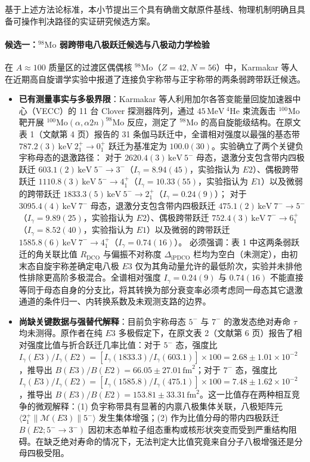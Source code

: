 基于上述方法论标准，本小节提出三个具有确凿文献原件基线、物理机制明确且具备可操作判决路径的实证研究候选方案。

\paragraph{候选一：$^{98}\mathrm{Mo}$ 弱跨带电八极跃迁候选与八极动力学检验}
在 $A \approx 100$ 质量区的过渡区偶偶核 $^{98}\mathrm{Mo}$（$Z=42, N=56$）中，Karmakar 等人在近期高自旋谱学实验中报道了连接负宇称带与正宇称带的两条弱跨带跃迁候选。\cite{karmakar-2026-98mo-octupole}
\begin{itemize}
\item \textbf{已有测量事实与多极界限}：Karmakar 等人利用加尔各答变能量回旋加速器中心（VECC）的 11 台 Clover 探测器阵列，通过 $45\,\mathrm{MeV}\ ^4\mathrm{He}$ 束流轰击 $^{100}\mathrm{Mo}$ 靶开展 $^{100}\mathrm{Mo}(\alpha, \alpha 2n)^{98}\mathrm{Mo}$ 反应，测定了 $^{98}\mathrm{Mo}$ 的高自旋能级结构。在原文表 1（文献第 4 页）报告的 31 条伽马跃迁中，全谱相对强度以最强的基态带 $787.2(3)\,\mathrm{keV}\ 2_1^+ \to 0_1^+$ 跃迁为基准定为 $100.0(30)$。实验确立了两个关键负宇称母态的退激路径：
对于 $2620.4(3)\,\mathrm{keV}\ 5^-$ 母态，退激分支包含带内四极跃迁 $603.1(2)\,\mathrm{keV}\ 5^- \to 3^-$（$I_\gamma = 8.94(45)$，实验指认为 $E2$）、偶极跨带跃迁 $1110.8(3)\,\mathrm{keV}\ 5^- \to 4_1^+$（$I_\gamma = 10.33(55)$，实验指认为 $E1$）以及微弱的跨带跃迁 $1833.3(5)\,\mathrm{keV}\ 5^- \to 2_1^+$（$I_\gamma = 0.24(9)$）；
对于 $3095.4(4)\,\mathrm{keV}\ 7^-$ 母态，退激分支包含带内四极跃迁 $475.1(2)\,\mathrm{keV}\ 7^- \to 5^-$（$I_\gamma = 9.89(25)$，实验指认为 $E2$）、偶极跨带跃迁 $752.4(3)\,\mathrm{keV}\ 7^- \to 6_1^+$（$I_\gamma = 8.52(40)$，实验指认为 $E1$）以及微弱的跨带跃迁 $1585.8(6)\,\mathrm{keV}\ 7^- \to 4_1^+$（$I_\gamma = 0.74(16)$）。
必须强调：表 1 中这两条弱跃迁的角关联比值 $R_{\mathrm{DCO}}$ 与偏振不对称度 $\Delta_{\mathrm{iPDCO}}$ 栏均为空白（未测定），由初末态自旋宇称差确定电八极 $E3$ 仅为其角动量允许的最低阶次，实验并未排他性排除更高阶多极混合。全谱相对强度 $I_\gamma = 0.24(9)$ 与 $0.74(16)$ 不能直接等同于母态自身的分支比，将其转换为部分衰变率必须考虑同一母态其它退激通道的条件归一、内转换系数及未观测支路的边界。
\item \textbf{尚缺关键数据与强替代解释}：目前负宇称母态 $5^-$ 与 $7^-$ 的激发态绝对寿命 $\tau$ 均未测得。原作者在纯 $E3$ 多极假定下，在原文表 2（文献第 6 页）报告了相对强度比值与折合跃迁几率比值：对于 $5^-$ 态，强度比 $I_\gamma(E3)/I_\gamma(E2) = [I_\gamma(1833.3)/I_\gamma(603.1)] \times 100 = 2.68 \pm 1.01 \times 10^{-2}$，推导出 $B(E3)/B(E2) = 66.05 \pm 27.01\,\mathrm{fm}^2$；对于 $7^-$ 态，强度比 $I_\gamma(E3)/I_\gamma(E2) = [I_\gamma(1585.8)/I_\gamma(475.1)] \times 100 = 7.48 \pm 1.62 \times 10^{-2}$，推导出 $B(E3)/B(E2) = 153.81 \pm 33.31\,\mathrm{fm}^2$。这一比值存在两种相互竞争的微观解释：(1) 负宇称带具有显著的内禀八极集体关联，八极矩阵元 $\langle 2_1^+ \| \mathcal{M}(E3) \| 5^- \rangle$ 发生集体增强；(2) 作为比值分母的带内四极跃迁 $B(E2; 5^- \to 3^-)$ 因初末态单粒子组态重构或核形状突变而受到严重结构阻碍。在缺乏绝对寿命的情况下，无法判定大比值究竟来自分子八极增强还是分母四极受阻。

\end{itemize}
